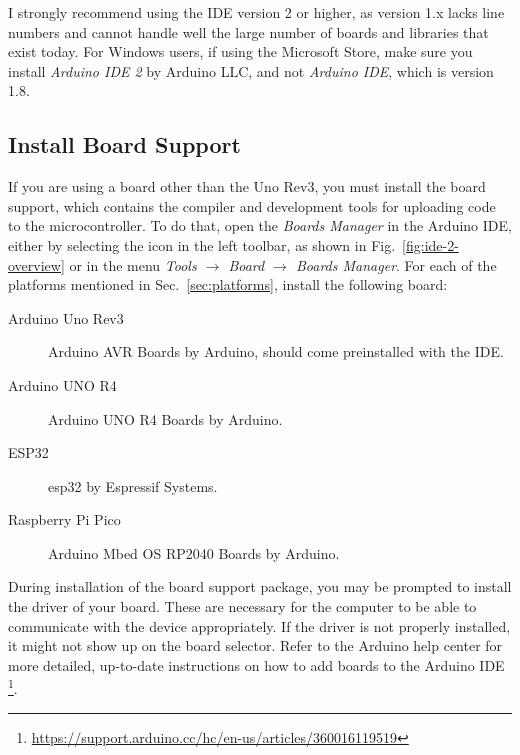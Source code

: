 I strongly recommend using the IDE version 2 or higher, as version 1.x lacks line numbers and cannot handle  well the large number of boards and libraries that exist today.
For Windows users, if using the Microsoft Store, make sure you install \emph{Arduino IDE 2} by Arduino LLC, and not \emph{Arduino IDE}, which is version 1.8.

\subsection{Install Board Support}
If you are using a board other than the Uno Rev3, you must install the board support, which contains the compiler and development tools for uploading code to the microcontroller.
To do that, open the \emph{Boards Manager} in the Arduino IDE, either by selecting the icon in the left toolbar, as shown in Fig.~\ref{fig:ide-2-overview} or in the menu \emph{Tools $\to$ Board $\to$ Boards Manager}.
For each of the platforms mentioned in Sec.~\ref{sec:platforms}, install the following board:
\begin{description}
\item[Arduino Uno Rev3] Arduino AVR Boards by Arduino, should come preinstalled with the IDE.
\item[Arduino UNO R4] Arduino UNO R4 Boards by Arduino.
\item[ESP32] esp32 by Espressif Systems.
\item[Raspberry Pi Pico] Arduino Mbed OS RP2040 Boards by Arduino.
\end{description}

During installation of the board support package, you may be prompted to install the driver of your board.
These are necessary for the computer to be able to communicate with the device appropriately.
If the driver is not properly installed, it might not show up on the board selector.
Refer to the Arduino help center for more detailed, up-to-date instructions on how to add boards to the Arduino IDE%
\footnote{\url{https://support.arduino.cc/hc/en-us/articles/360016119519}}.

